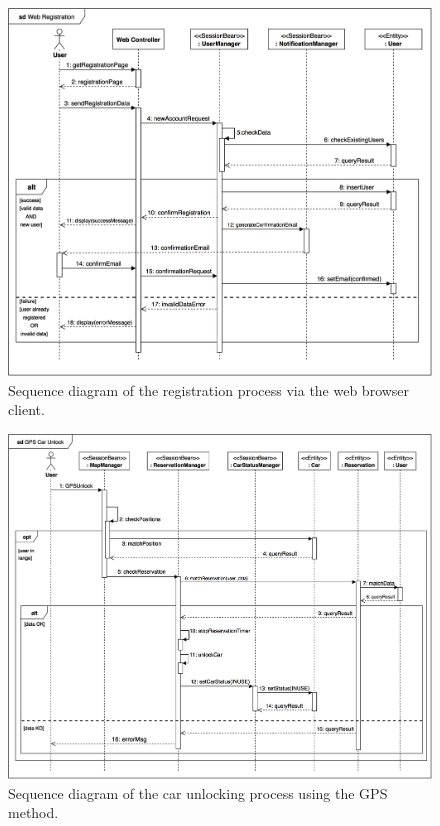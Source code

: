 \begin{figure}[H]
\begin{center}
		\includegraphics[width=\textwidth]{./arch_design/diagrams/registration_sd.png}
		\caption{Sequence diagram of the registration process via the web browser client.}
		\label{registration_sd}
\end{center}
\end{figure}

\begin{figure}[H]
\begin{center}
		\includegraphics[width=\textwidth]{./arch_design/diagrams/gps_unlock_sd.png}
		\caption{Sequence diagram of the car unlocking process using the GPS method.}
		\label{gps_unlock_sd}
\end{center}
\end{figure}

